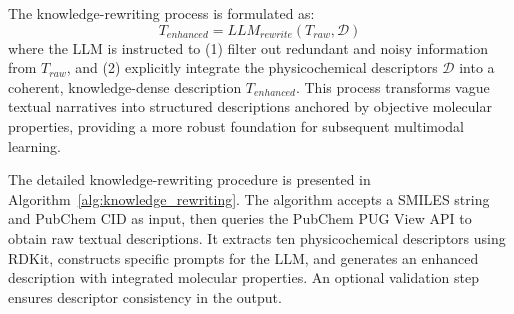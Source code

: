 \documentclass[journal]{IEEEtran}
\begin{document}
The knowledge-rewriting process is formulated as:
\begin{equation}
T_{enhanced} = LLM_{rewrite}(T_{raw}, \mathcal{D})
\end{equation}
where the LLM is instructed to (1) filter out redundant and noisy information from $T_{raw}$, and (2) explicitly integrate the physicochemical descriptors $\mathcal{D}$ into a coherent, knowledge-dense description $T_{enhanced}$. This process transforms vague textual narratives into structured descriptions anchored by objective molecular properties, providing a more robust foundation for subsequent multimodal learning.

The detailed knowledge-rewriting procedure is presented in Algorithm~\ref{alg:knowledge_rewriting}. The algorithm accepts a SMILES string and PubChem CID as input, then queries the PubChem PUG View API to obtain raw textual descriptions. It extracts ten physicochemical descriptors using RDKit, constructs specific prompts for the LLM, and generates an enhanced description with integrated molecular properties. An optional validation step ensures descriptor consistency in the output.
\end{document}
